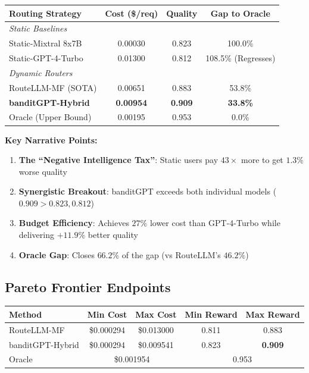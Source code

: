 \begin{tabular}{lccc}
\toprule
\textbf{Routing Strategy} & \textbf{Cost (\$/req)} & \textbf{Quality} & \textbf{Gap to Oracle} \\
\midrule
\multicolumn{4}{l}{\textit{Static Baselines}} \\
\quad Static-Mixtral 8x7B & 0.00030 & 0.823 & 100.0\% \\
\quad Static-GPT-4-Turbo & 0.01300 & 0.812 & 108.5\% (Regresses) \\
\midrule
\multicolumn{4}{l}{\textit{Dynamic Routers}} \\
\quad RouteLLM-MF (SOTA) & 0.00651 & 0.883 & 53.8\% \\
\quad \textbf{banditGPT-Hybrid} & \textbf{0.00954} & \textbf{0.909} & \textbf{33.8\%} \\
\midrule
\quad Oracle (Upper Bound) & 0.00195 & 0.953 & 0.0\% \\
\bottomrule
\end{tabular}

\vspace{1em}

\textbf{Key Narrative Points:}

\begin{enumerate}
    \item \textbf{The ``Negative Intelligence Tax''}: Static users pay $43\times$ more to get $1.3\%$ worse quality
    \item \textbf{Synergistic Breakout}: banditGPT exceeds both individual models ($0.909 > 0.823, 0.812$)
    \item \textbf{Budget Efficiency}: Achieves $27\%$ lower cost than GPT-4-Turbo while delivering $+11.9\%$ better quality
    \item \textbf{Oracle Gap}: Closes $66.2\%$ of the gap (vs RouteLLM's $46.2\%$)
\end{enumerate}

\subsection*{Pareto Frontier Endpoints}

\begin{tabular}{lcccc}
\toprule
\textbf{Method} & \textbf{Min Cost} & \textbf{Max Cost} & \textbf{Min Reward} & \textbf{Max Reward} \\
\midrule
RouteLLM-MF & \$0.000294 & \$0.013000 & 0.811 & 0.883 \\
banditGPT-Hybrid & \$0.000294 & \$0.009541 & 0.823 & \textbf{0.909} \\
Oracle & \multicolumn{2}{c}{\$0.001954} & \multicolumn{2}{c}{0.953} \\
\bottomrule
\end{tabular}

